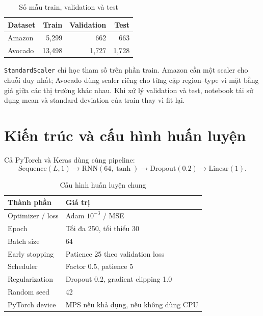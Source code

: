 \documentclass[12pt,a4paper]{report}
\newcommand{\codeinline}[1]{\texttt{#1}}
\begin{document}
\begin{table}[H]
\centering
\caption{Số mẫu train, validation và test}
\label{tab:split}
\begin{tabular}{lrrr}
\toprule
\textbf{Dataset} & \textbf{Train} & \textbf{Validation} & \textbf{Test} \\
\midrule
Amazon & 5,299 & 662 & 663 \\
Avocado & 13,498 & 1,727 & 1,728 \\
\bottomrule
\end{tabular}
\end{table}

\codeinline{StandardScaler} chỉ học tham số trên phần train. Amazon cần một scaler cho chuỗi duy nhất;
Avocado dùng scaler riêng cho từng cặp region--type vì mặt bằng giá giữa các thị trường khác nhau. Khi
xử lý validation và test, notebook tái sử dụng mean và standard deviation của train thay vì fit lại.

\section{Kiến trúc và cấu hình huấn luyện}
Cả PyTorch và Keras dùng cùng pipeline:
\begin{equation}
    \text{Sequence}(L,1)
    \rightarrow \text{RNN}(64,\tanh)
    \rightarrow \text{Dropout}(0.2)
    \rightarrow \text{Linear}(1).
\end{equation}

\begin{table}[H]
\centering
\caption{Cấu hình huấn luyện chung}
\label{tab:training_config}
\begin{tabular}{ll}
\toprule
\textbf{Thành phần} & \textbf{Giá trị} \\
\midrule
Optimizer / loss & Adam $10^{-3}$ / MSE \\
Epoch & Tối đa 250, tối thiểu 30 \\
Batch size & 64 \\
Early stopping & Patience 25 theo validation loss \\
Scheduler & Factor 0.5, patience 5 \\
Regularization & Dropout 0.2, gradient clipping 1.0 \\
Random seed & 42 \\
PyTorch device & MPS nếu khả dụng, nếu không dùng CPU \\
\bottomrule
\end{tabular}
\end{table}
\end{document}
